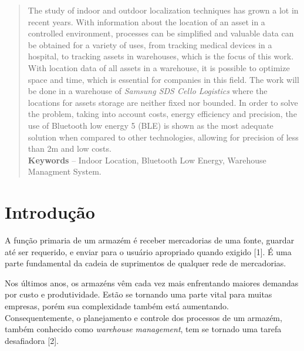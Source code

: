 \documentclass[]{politex}
\begin{document}
\begin{abstract}
The study of indoor and outdoor localization techniques has grown a lot in recent years. With information about the location of an asset in a controlled environment, processes can be simplified and valuable data can be obtained for a variety of uses, from tracking medical devices in a hospital, to tracking assets in warehouses, which is the focus of this work. With location data of all assets in a warehouse, it is possible to optimize space and time, which is essential for companies in this field.
The work will be done in a warehouse of \textit{Samsung SDS Cello Logistics} where the locations for assets storage are neither fixed nor bounded. In order to solve the problem, taking into account costs, energy efficiency and precision, the use of Bluetooth low energy 5 (BLE) is shown as the most adequate solution when compared to other technologies, allowing for precision of less than 2m and low costs.
%
\\[3\baselineskip]
%
\textbf{Keywords} -- Indoor Location, Bluetooth Low Energy, Warehouse Managment System.
\end{abstract}






\sumario



\part{Introdução}
A função primaria de um armazém é receber mercadorias de uma fonte, guardar até ser requerido, e enviar para o usuário apropriado quando exigido [1]. É uma parte fundamental da cadeia de suprimentos de qualquer rede de mercadorias.

Nos últimos anos, os armazéns vêm cada vez mais enfrentando maiores demandas por custo e produtividade. Estão se tornando uma parte vital para muitas empresas, porém sua complexidade também está aumentando. Consequentemente, o planejamento e controle dos processos de um armazém, também conhecido como \textit{warehouse management}, tem se tornado uma tarefa desafiadora [2].
\end{document}
